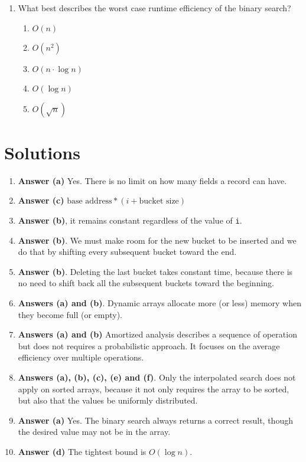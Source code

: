 \documentclass[11pt]{article}
\begin{document}
\begin{enumerate}
\item What best describes the worst case runtime efficiency of the binary
search?
\begin{enumerate}
\item \(O(n)\)
\item \(O(n^2)\)
\item \(O(n \cdot \log n)\)
\item \(O(\log n)\)
\item \(O(\sqrt{n})\)
\end{enumerate}
\end{enumerate}

\section{Solutions}
\label{sec:orgfe52edb}

\begin{enumerate}
\item \textbf{Answer (a)} Yes. There is no limit on how many fields a record
can have.

\item \textbf{Answer (c)} \(\text{base address} * (i + \text{bucket size})\)

\item \textbf{Answer (b)}, it remains constant regardless of the value of \texttt{i}.

\item \textbf{Answer (b)}. We must make room for the new bucket to be inserted
and we do that by shifting every subsequent bucket toward the
end.

\item \textbf{Answer (b)}. Deleting the last bucket takes constant time,
because there is no need to shift back all the subsequent buckets
toward the beginning.

\item \textbf{Answers (a) and (b)}. Dynamic arrays allocate more (or less)
memory when they become full (or empty).

\item \textbf{Answers (a) and (b)} Amortized analysis describes a sequence of
operation but does not requires a probabilistic approach. It
focuses on the average efficiency over multiple operations.

\item \textbf{Answers (a), (b), (c), (e) and (f)}. Only the interpolated search
does not apply on sorted arrays, because it not only requires the
array to be sorted, but also that the values be uniformly
distributed.

\item \textbf{Answer (a)} Yes. The binary search always returns a correct result, though
the desired value may not be in the array.

\item \textbf{Answer (d)} The tightest bound is \(O(\log n)\).
\end{enumerate}
\end{document}
